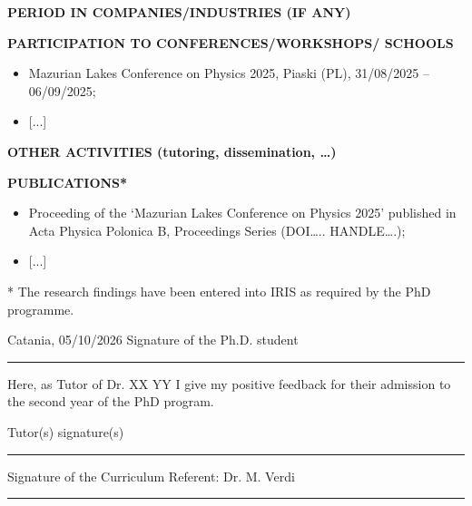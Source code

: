 \documentclass[11pt, a4paper]{article}
\begin{document}
\vspace{1.8em}

\textbf{PERIOD IN COMPANIES/INDUSTRIES (IF ANY)}


\vspace{1.8em}


\textbf{PARTICIPATION TO CONFERENCES/WORKSHOPS/ SCHOOLS} 
\begin{itemize}
    \item Mazurian Lakes Conference on Physics 2025, Piaski (PL), 31/08/2025 – 06/09/2025;
    \item {[...]}
\end{itemize}

\vspace{1.8em}

\textbf{OTHER ACTIVITIES (tutoring, dissemination, \dots)} 


\vspace{1.8em}

\textbf{PUBLICATIONS*} 



\begin{itemize}
    \item Proceeding of the ‘Mazurian Lakes Conference on Physics 2025’ published in Acta Physica Polonica B, Proceedings Series (DOI….. HANDLE….);
    \item {[...]}
\end{itemize}


\small{* The research findings have been entered into IRIS as required by the PhD programme.}

\vspace{1.5cm}

\begin{noindent}
Catania, 05/10/2026 \hfill Signature of the Ph.D. student \rule{6cm}{0.4pt}
\end{noindent}

\vspace{4em}

Here, as Tutor of Dr. XX YY I give my positive feedback for their admission to the second year of the PhD program.

\vspace{4em}
Tutor(s) signature(s) \rule{6cm}{0.4pt}

\vspace{4em}
Signature of the Curriculum Referent: Dr. M. Verdi \rule{4cm}{0.4pt}
\end{document}
